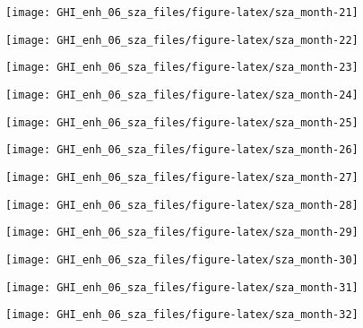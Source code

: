 \documentclass[
  10pt,
  a4paper,oneside]{article}
\begin{document}
\begin{center}\texttt{[image: GHI\_enh\_06\_sza\_files/figure-latex/sza\_month-21]} \end{center}

\begin{center}\texttt{[image: GHI\_enh\_06\_sza\_files/figure-latex/sza\_month-22]} \end{center}

\begin{center}\texttt{[image: GHI\_enh\_06\_sza\_files/figure-latex/sza\_month-23]} \end{center}

\begin{center}\texttt{[image: GHI\_enh\_06\_sza\_files/figure-latex/sza\_month-24]} \end{center}

\begin{center}\texttt{[image: GHI\_enh\_06\_sza\_files/figure-latex/sza\_month-25]} \end{center}

\begin{center}\texttt{[image: GHI\_enh\_06\_sza\_files/figure-latex/sza\_month-26]} \end{center}

\begin{center}\texttt{[image: GHI\_enh\_06\_sza\_files/figure-latex/sza\_month-27]} \end{center}

\begin{center}\texttt{[image: GHI\_enh\_06\_sza\_files/figure-latex/sza\_month-28]} \end{center}

\begin{center}\texttt{[image: GHI\_enh\_06\_sza\_files/figure-latex/sza\_month-29]} \end{center}

\begin{center}\texttt{[image: GHI\_enh\_06\_sza\_files/figure-latex/sza\_month-30]} \end{center}

\begin{center}\texttt{[image: GHI\_enh\_06\_sza\_files/figure-latex/sza\_month-31]} \end{center}

\begin{center}\texttt{[image: GHI\_enh\_06\_sza\_files/figure-latex/sza\_month-32]} \end{center}
\end{document}
